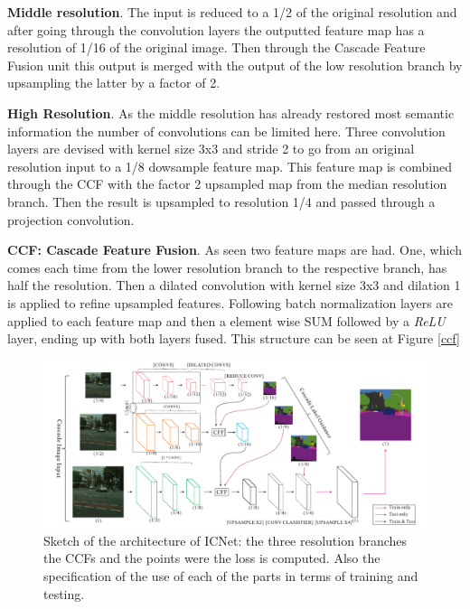 \textbf{Middle resolution}. The input is reduced to a 1/2 of the original resolution and after going through the convolution layers the outputted feature map has a resolution of 1/16 of the original image. Then through the Cascade Feature Fusion unit this output is merged with the output of the low resolution branch by upsampling the latter by a factor of 2.\newline

\textbf{High Resolution}. As the middle resolution has already restored most semantic information the number of convolutions can be limited here. Three convolution layers are devised with kernel size 3x3 and stride 2 to go from an original resolution input to a 1/8 dowsample feature map. This feature map is combined through the CCF with the factor 2 upsampled map from the median resolution branch. Then the result is upsampled to resolution 1/4 and passed through a projection convolution.\newline

\textbf{CCF: Cascade Feature Fusion}. As seen two feature maps are had. One, which comes each time from the lower resolution branch to the respective branch, has half the resolution. Then a dilated convolution with kernel size 3x3 and dilation 1 is applied to refine upsampled features. Following batch normalization layers are applied to each feature map and then a element wise SUM followed by a \textit{ReLU} layer, ending up with both layers fused. This structure can be seen at Figure \ref{ccf}\newline

\begin{figure}
\begin{center}
\includegraphics[scale=0.45]{icnet.png}
\caption{Sketch of the architecture of ICNet: the three resolution branches the CCFs and the points were the loss is computed. Also the specification of the use of each of the parts in terms of training and testing.}
\label{icnet}
\end{center}
\end{figure}

